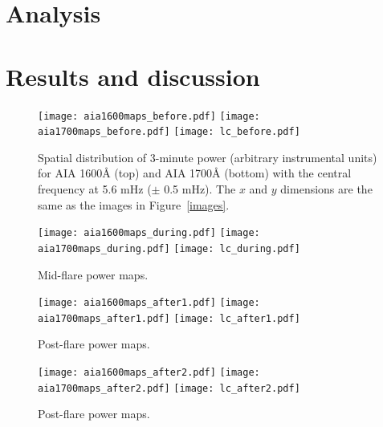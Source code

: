 





\clearpage
\section{Analysis}



\clearpage
\section{Results and discussion}
%



\begin{figure*}[htb!]\centering
    \texttt{[image: aia1600maps\_before.pdf]}
    \texttt{[image: aia1700maps\_before.pdf]}
    \texttt{[image: lc\_before.pdf]}
    \caption{%
        Spatial distribution of 3-minute power (arbitrary instrumental units)
        for AIA 1600\AA{} (top) and AIA 1700\AA{} (bottom)
        with the central frequency at 5.6 mHz ($\pm$ 0.5 mHz).
        The $x$ and $y$ dimensions are the same as the images in
        Figure~\ref{images}.
    \label{powermaps}}
\end{figure*}

\begin{figure*}[htb!]\centering
    \texttt{[image: aia1600maps\_during.pdf]}
    \texttt{[image: aia1700maps\_during.pdf]}
    \texttt{[image: lc\_during.pdf]}
    \caption{%
        Mid-flare power maps.
    \label{powermaps_during}}
\end{figure*}

\begin{figure*}[htb!]\centering
    \texttt{[image: aia1600maps\_after1.pdf]}
    \texttt{[image: aia1700maps\_after1.pdf]}
    \texttt{[image: lc\_after1.pdf]}
    \caption{%
        Post-flare power maps.
    \label{powermaps_after1}}
\end{figure*}

\begin{figure*}[htb!]\centering
    \texttt{[image: aia1600maps\_after2.pdf]}
    \texttt{[image: aia1700maps\_after2.pdf]}
    \texttt{[image: lc\_after2.pdf]}
    \caption{%
        Post-flare power maps.
    \label{powermaps_after2}}
\end{figure*}

